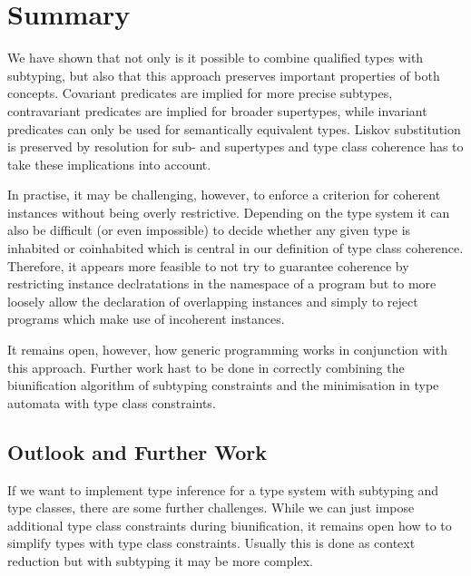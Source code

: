 
\chapter{Summary}
\label{ch:summary}

We have shown that not only is it possible to combine qualified types with subtyping, but also that this approach preserves important properties of both concepts.
Covariant predicates are implied for more precise subtypes, contravariant predicates are implied for broader supertypes, while invariant predicates can only be used for semantically equivalent types.
Liskov substitution is preserved by resolution for sub- and supertypes and type class coherence has to take these implications into account.

In practise, it may be challenging, however, to enforce a criterion for coherent instances without being overly restrictive.
Depending on the type system it can also be difficult (or even impossible) to decide whether any given type is inhabited or coinhabited which is central in our definition of type class coherence.
Therefore, it appears more feasible to not try to guarantee coherence by restricting instance declratations in the namespace of a program but to more loosely allow the declaration of overlapping instances and simply to reject programs which make use of incoherent instances.

It remains open, however, how generic  programming works in conjunction with this approach.
Further work hast to be done in correctly combining the biunification algorithm of subtyping constraints and the minimisation in type automata with type class constraints.


\section{Outlook and Further Work}

If we want to implement type inference for a type system with subtyping and type classes, there are some further challenges.
While we can just impose additional type class constraints during biunification, it remains open how to to simplify types with type class constraints.
Usually this is done as context reduction \cite{jones2003qualified} but with subtyping it may be more complex.

